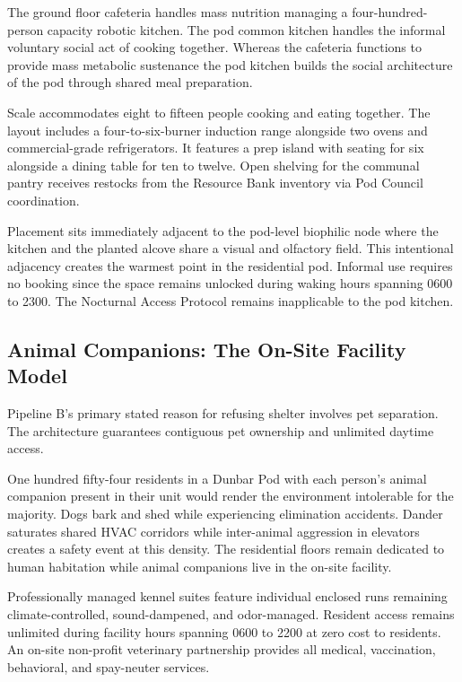 \documentclass[12pt, letterpaper]{article}
\begin{document}
The ground floor cafeteria handles mass nutrition managing a four-hundred-person capacity robotic kitchen. The pod common kitchen handles the informal voluntary social act of cooking together. Whereas the cafeteria functions to provide mass metabolic sustenance the pod kitchen builds the social architecture of the pod through shared meal preparation.

Scale accommodates eight to fifteen people cooking and eating together. The layout includes a four-to-six-burner induction range alongside two ovens and commercial-grade refrigerators. It features a prep island with seating for six alongside a dining table for ten to twelve. Open shelving for the communal pantry receives restocks from the Resource Bank inventory via Pod Council coordination.

Placement sits immediately adjacent to the pod-level biophilic node where the kitchen and the planted alcove share a visual and olfactory field. This intentional adjacency creates the warmest point in the residential pod. Informal use requires no booking since the space remains unlocked during waking hours spanning 0600 to 2300. The Nocturnal Access Protocol remains inapplicable to the pod kitchen.

\subsection{Animal Companions: The On-Site Facility Model}

Pipeline B's primary stated reason for refusing shelter involves pet separation. The architecture guarantees contiguous pet ownership and unlimited daytime access.

One hundred fifty-four residents in a Dunbar Pod with each person's animal companion present in their unit would render the environment intolerable for the majority. Dogs bark and shed while experiencing elimination accidents. Dander saturates shared HVAC corridors while inter-animal aggression in elevators creates a safety event at this density. The residential floors remain dedicated to human habitation while animal companions live in the on-site facility.

Professionally managed kennel suites feature individual enclosed runs remaining climate-controlled, sound-dampened, and odor-managed. Resident access remains unlimited during facility hours spanning 0600 to 2200 at zero cost to residents. An on-site non-profit veterinary partnership provides all medical, vaccination, behavioral, and spay-neuter services.
\end{document}
